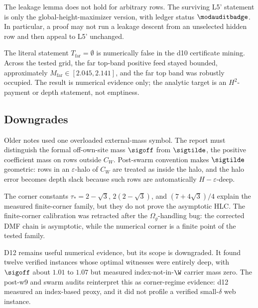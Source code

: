 \begin{refutedstatement}
 The leakage lemma does not hold for arbitrary rows.  The surviving L5'
statement is only the global-height-maximizer version, with ledger status
\(\modauditbadge\).  In particular, a proof may not run a leakage descent from an
unselected hidden row and then appeal to L5' unchanged.
\end{refutedstatement}

\begin{numericalresult}
\numbadge The literal statement \(T_{\mathrm{far}}=\emptyset\) is numerically false in
the d10 certificate mining.  Across the tested grid, the far top-band positive feed
stayed bounded, approximately \(M_{\mathrm{far}}\in[2.045,2.141]\), and the far top band
was robustly occupied.  The result is numerical evidence only; the analytic target is an
\(H^2\)-payment or depth statement, not emptiness.
\end{numericalresult}

\subsection{Downgrades}

\begin{downgradedstatement}[Sigma]
\downgradedbadge Older notes used one overloaded external-mass symbol.  The report must
distinguish the formal off-own-site mass \(\sigoff\) from \(\sigtilde\), the positive
coefficient mass on rows outside \(C_W\).  Post-swarm convention makes \(\sigtilde\) geometric:
rows in an \(\varepsilon\)-halo of \(C_W\) are treated as inside the halo, and the halo
error becomes depth slack because such rows are automatically \(H-\varepsilon\)-deep.
\end{downgradedstatement}

\begin{downgradedstatement}
\downgradedbadge The corner constants
\(\tau_*=2-\sqrt3\), \(2(2-\sqrt3)\), and \((7+4\sqrt3)/4\) explain the measured
finite-corner family, but they do not prove the asymptotic HLC.  The finite-corner
calibration was retracted after the \(\Omega_g\)-handling bug: the corrected DMF chain is
asymptotic, while the numerical corner is a finite point of the tested family.
\end{downgradedstatement}

\begin{downgradedstatement}[D12 scope]
\downgradedbadge D12 remains useful numerical evidence, but its scope is downgraded.
It found twelve verified instances whose optimal witnesses were entirely deep, with
\(\sigoff\) about \(1.01\) to \(1.07\) but measured index-not-in-\(\W\) carrier mass zero.  The
post-w9 and swarm audits reinterpret this as corner-regime evidence: d12 measured an
index-based proxy, and it did not profile a verified small-\(\delta\) web instance.
\end{downgradedstatement}

